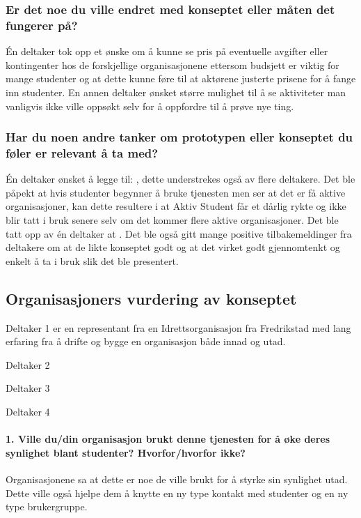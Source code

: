 \subsubsection{Er det noe du ville endret med konseptet eller måten det fungerer på?}
Én deltaker tok opp et ønske om å kunne se pris på eventuelle avgifter eller kontingenter hos de forskjellige organisasjonene ettersom budsjett er viktig for mange studenter og at dette kunne føre til at aktørene justerte prisene for å fange inn studenter. En annen deltaker ønsket større mulighet til å se aktiviteter man vanligvis ikke ville oppsøkt selv for å oppfordre til å prøve nye ting.

\subsubsection{Har du noen andre tanker om prototypen eller konseptet du føler er relevant å ta med?}
Én deltaker ønsket å legge til: , dette understrekes også av flere deltakere. Det ble påpekt at hvis studenter begynner å bruke tjenesten men ser at det er få aktive organisasjoner, kan dette resultere i at Aktiv Student får et dårlig rykte og ikke blir tatt i bruk senere selv om det kommer flere aktive organisasjoner. Det ble tatt opp av én deltaker at . Det ble også gitt mange positive tilbakemeldinger fra deltakere om at de likte konseptet godt og at det virket godt gjennomtenkt og enkelt å ta i bruk slik det ble presentert.


\subsection{Organisasjoners vurdering av konseptet}
Deltaker 1 er en representant fra en Idrettsorganisasjon fra Fredrikstad med lang erfaring fra å drifte og bygge en organisasjon både innad og utad.

Deltaker 2

Deltaker 3

Deltaker 4

\paragraph{1. Ville du/din organisasjon brukt denne tjenesten for å øke deres synlighet blant studenter? Hvorfor/hvorfor ikke?}
Organisasjonene sa at dette er noe de ville brukt for å styrke sin synlighet utad. Dette ville også hjelpe dem å knytte en ny type kontakt med studenter og en ny type brukergruppe.


